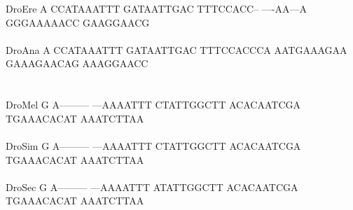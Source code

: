 \documentclass[11pt,twoside,reqno,a4paper]{article}
\begin{document}
{DroEre	A	CCATAAATTT	GATAATTGAC	TTTCCACC--	----AA---A	GGGAAAAACC	GAAGGAACG\\
\hspace*{7\charwidth}\hspace*{1\charwidth}\hspace*{1\charwidth}\hspace*{1\charwidth}\hspace*{1\charwidth}\hspace*{1\charwidth}\hspace*{1\charwidth}\\
DroAna	A	CCATAAATTT	GATAATTGAC	TTTCCACCCA	AATGAAAGAA	GAAAGAACAG	AAAGGAACC\\
\hspace*{7\charwidth}\hspace*{1\charwidth}\hspace*{1\charwidth}\hspace*{1\charwidth}\hspace*{1\charwidth}\hspace*{1\charwidth}\hspace*{1\charwidth}\\
\\
DroMel	G	A---------	---AAAATTT	CTATTGGCTT	ACACAATCGA	TGAAACACAT	AAATCTTAA\\
\hspace*{7\charwidth}\hspace*{1\charwidth}\hspace*{1\charwidth}\hspace*{1\charwidth}\hspace*{1\charwidth}\hspace*{1\charwidth}\hspace*{1\charwidth}\\
DroSim	G	A---------	---AAAATTT	CTATTGGCTT	ACACAATCGA	TGAAACACAT	AAATCTTAA\\
\hspace*{7\charwidth}\hspace*{1\charwidth}\hspace*{1\charwidth}\hspace*{1\charwidth}\hspace*{1\charwidth}\hspace*{1\charwidth}\hspace*{1\charwidth}\\
DroSec	G	A---------	---AAAATTT	ATATTGGCTT	ACACAATCGA	TGAAACACAT	AAATCTTAA\\
\hspace*{7\charwidth}\hspace*{1\charwidth}\hspace*{1\charwidth}\hspace*{1\charwidth}\hspace*{1\charwidth}\hspace*{1\charwidth}\hspace*{1\charwidth}\\
}
\end{document}
